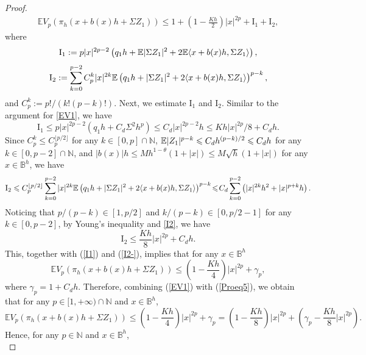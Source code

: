 \documentclass[aap]{imsart}
\theoremstyle{plain}
\theoremstyle{definition}
\begin{document}
\begin{proof}
\begin{align*}
\mathbb{E}V_p(\pi_h(x+b(x)h+\Sigma Z_1)) 
\leqslant 1+\left(1-\frac{Kh}{2}\right)|x|^{2p}+\mathrm{I}_1+\mathrm{I}_2,
\end{align*}
where
$$\mathrm{I}_1 := p|x|^{2p-2}\left(q_1h+\mathbb{E}|\Sigma Z_1|^2+2\mathbb{E}\langle x+b(x)h, \Sigma Z_1 \rangle\right),$$
$$\mathrm{I}_2:=\sum_{k =0}^{p-2}C_p^k|x|^{2k}\mathbb{E}\left(q_1h+|\Sigma Z_1|^2+2\langle x+b(x)h, \Sigma Z_1 \rangle\right)^{p-k},$$
and $C_p^k := p!/(k!(p-k)!)$.
Next, we estimate $\mathrm{I}_1$ and $\mathrm{I}_2$. 
Similar to the argument for \eqref{EV1}, we have	
\begin{equation}\label{I1}
\mathrm{I}_1\leqslant p|x|^{2p-2}\left(q_1h+C_d\Sigma^2 h^p\right)\leqslant C_d|x|^{2p-2}h\leqslant Kh|x|^{2p}/8+C_dh.	
\end{equation}
Since $C_p^k\leqslant C_p^{\lfloor p/2 \rfloor}$ for any $k\in[0, p]\cap \mathbb{N}$, $\mathbb{E}|Z_1|^{p-k} \leqslant C_dh^{(p-k)/2}\leqslant C_dh$ for any $k\in[0,p-2]\cap\mathbb{N}$, and $|b(x)|h\leqslant Mh^{1-\theta}(1+|x|)\leqslant M\sqrt{h}(1+|x|)$ for any $x\in\mathbb{B}^h$, we have
\begin{equation}\label{I2}
\begin{aligned}
\mathrm{I}_2\leqslant C_p^{\lfloor p/2 \rfloor}\sum_{k =0}^{p-2}|x|^{2k}\mathbb{E}\left(q_1h+|\Sigma Z_1|^2+2\langle x+b(x)h, \Sigma Z_1 \rangle\right)^{p-k}\!\leqslant\! C_d\sum_{k =0}^{p-2}\left(|x|^{2k}h^2+|x|^{p+k}h\right).	
\end{aligned}
\end{equation}
Noticing that $p/(p-k)\in[1, p/2]$ and $k/(p-k)\in[0, p/2-1]$ for any $k\in [0, p-2]$, by Young's inequality and \eqref{I2}, we have
\begin{equation}\label{I2-}
\mathrm{I}_2\leqslant \frac{Kh}{8}|x|^{2p} + C_dh.
\end{equation}
This, together with (\ref{I1}) and (\ref{I2-}), implies that for any $x\in\mathbb{B}^h$
\begin{equation}\label{Proeq5}
\mathbb{E}V_p(\pi_h(x+b(x)h+\Sigma Z_1)) \leqslant \left(1-\frac{Kh}{4}\right)|x|^{2p}+\gamma_p,
\end{equation}
where $\gamma_p = 1+C_dh$. Therefore, combining (\ref{EV1}) with (\ref{Proeq5}), we obtain that for any $p\in[1, +\infty)\cap\mathbb{N}$ and $x\in\mathbb{B}^h$,
$$\mathbb{E}V_p(\pi_h(x+b(x)h+\Sigma Z_1)) \leqslant \left(1-\frac{Kh}{4}\right)|x|^{2p}+\gamma_p = \left(1-\frac{Kh}{8}\right)|x|^{2p}+\left(\gamma_p -\frac{Kh}{8}|x|^{2p}\right).$$
Hence, for any $p\in\mathbb{N}$ and $x\in\mathbb{B}^h$,
\begin{equation}\label{Ev}

\end{equation}
\end{proof}
\end{document}
